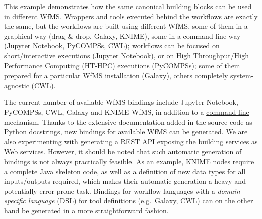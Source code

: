 This example demonstrates how the same canonical building blocks can be
used in different WfMS. Wrappers and tools executed behind the workflows
are exactly the same, but the workflows are built using different WfMS,
some of them in a graphical way (drag \& drop, Galaxy, KNIME), some in a
command line way (Jupyter Notebook, PyCOMPSs, CWL); workflows can be
focused on short/interactive executions (Jupyter Notebook), or on High
Throughput/High Performance Computing (HT-HPC) executions (PyCOMPSs);
some of them prepared for a particular WfMS installation (Galaxy),
others completely system-agnostic (CWL).

The current number of available WfMS bindings include Jupyter Notebook,
PyCOMPSs, CWL, Galaxy and KNIME WfMS, in addition to a
\href{http://mmb.irbbarcelona.org/biobb/availability/tutorials/command-line}{command
line} mechanism. Thanks to the extensive documentation added in the
source code as Python docstrings, new bindings for available WfMS can be
generated. We are also experimenting with generating a REST API exposing
the building services as Web services. However, it should be noted that
such automatic generation of bindings is not always practically
feasible. As an example, KNIME nodes require a complete Java skeleton
code, as well as a definition of new data types for all inputs/outputs
required, which makes their automatic generation a heavy and potentially
error-prone task. Bindings for workflow languages with a
\emph{domain-specific language} (DSL) for tool definitions (e.g.~Galaxy,
CWL) can on the other hand be generated in a more straightforward
fashion.

